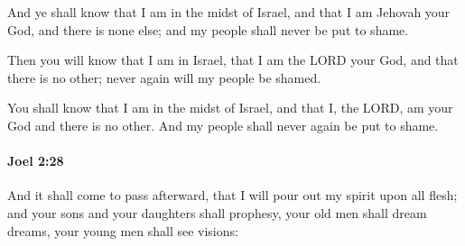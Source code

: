 			\begin{versebox}
					\item[BHS] 
					\item[LXX] 
					\item[ASV] And ye shall know that I am in the midst of Israel, and that I am Jehovah your God, and there is none else; and my people shall never be put to shame.
					\item[NIV] Then you will know that I am in Israel, that I am the LORD your God, and that there is no other; never again will my people be shamed.
					\item[NRSV] You shall know that I am in the midst of Israel, and that I, the LORD, am your God and there is no other. And my people shall never again be put to shame.
			\end{versebox}

		\paragraph{Joel 2:28} %
			\label{JOEL-2-28}

			And it shall come to pass afterward, that I will pour out my spirit upon all flesh; and your sons and your daughters shall prophesy, your old men shall dream dreams, your young men shall see visions:

